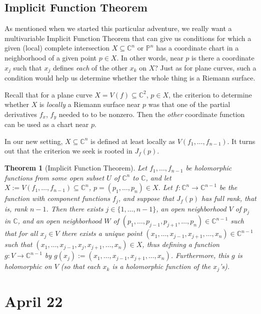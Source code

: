 \documentclass[12pt]{article}
\newcommand{\cx}{\mathbb{C}}
\newcommand{\p}{\mathbb{P}}
\newcommand{\ita}[1]{\textit{#1}}
\newcommand{\oneton}[1]{\{1,\dotsc,#1\}}
\newcommand{\paren}[1]{\left( #1 \right)}
\newtheorem{theorem}{Theorem}[section]
\theoremstyle{definition}
\theoremstyle{remark}
\begin{document}
\subsection{Implicit Function Theorem}
As mentioned when we started this particular adventure, we really want a multivariable Implicit Function Theorem that can give us conditions for which a given (local) complete intersection $X \subseteq \cx^n$ or $\p^n$ has a coordinate chart in a neighborhood of a given point $p \in X$. In other words, near $p$ is there a coordinate $x_j$ such that $x_j$ defines \ita{each} of the other $x_k$ on $X$? Just as for plane curves, such a condition would help us determine whether the whole thing is a Riemann surface.

Recall that for a plane curve $X = V(f) \subseteq \cx^2$, $p \in X$, the criterion to determine whether $X$ is \ita{locally} a Riemann surface near $p$ was that one of the partial derivatives $f_x$, $f_y$ needed to to be nonzero. Then the \ita{other} coordinate function can be used as a chart near $p$.

In our new setting, $X \subseteq \cx^n$ is defined at least locally as $V \paren{ f_1 , \dotsc , f_{n-1} }$. It turns out that the criterion we seek is rooted in $J_f(p)$.
\begin{theorem}[Implicit Function Theorem]
    Let $f_1 , \dotsc , f_{n-1}$ be holomorphic functions from some open subset $U$ of $\cx^n$ to $\cx$, and let $X := V \paren{ f_1 , \dotsc , f_{n-1} } \subseteq \cx^n$, $p = \paren{p_1 , \dotsc , p_n} \in X$. Let $f : \cx^n \to \cx^{n-1}$ be the function with component functions $f_j$, and suppose that $J_f(p)$ has full rank, that is, rank $n-1$. Then there exists $j \in \oneton{n-1}$, an open neighborhood $V$ of $p_j$ in $\cx$, and an open neighborhood $W$ of $\paren{ p_1 , \dotsc , p_{j-1} , p_{j+1} , \dotsc , p_n } \in \cx^{n-1}$ such that for all $x_j \in V$ there exists a unique point $\paren{ x_1 , \dotsc , x_{j-1} , x_{j+1} , \dotsc , x_n } \in \cx^{n-1}$ such that $\paren{x_1 , \dotsc , x_{j-1} , x_j , x_{j+1} , \dotsc , x_n} \in X$, thus defining a function $g : V \to \cx^{n-1}$ by $g(x_j) := \paren{ x_1 , \dotsc , x_{j-1} , x_{j+1} , \dotsc , x_n }$. Furthermore, this $g$ is holomorphic on $V$ (so that each $x_k$ is a holomorphic function of the $x_j$'s).
\end{theorem}

\section{April 22}
\end{document}
